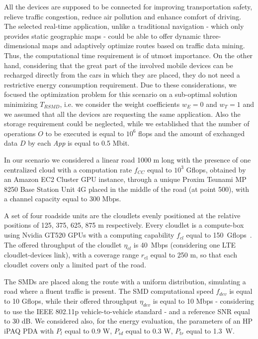 \documentclass[twoside,openright]{report}
\begin{document}
All the devices are supposed to be connected for improving transportation safety, relieve traffic congestion, reduce air pollution and enhance comfort  of driving.
The selected real-time application, unlike a traditional navigation - which only provides static geographic maps - could be able to offer dynamic three-dimensional maps and adaptively optimize routes based on traffic data mining. 
Thus, the computational time requirement is of utmost importance. 
On the other hand, considering that the great part of the involved mobile devices can be recharged directly from the cars in which they are placed, they do not need a restrictive energy consumption requirement.  
Due to these considerations, we focused the optimization problem for this scenario on a sub-optimal solution minimizing $T_\textit{RSMD}$, i.e. we consider the weight coefficients $w_E = 0$ and $w_T = 1$ and we assumed that all the devices are requesting the same application. Also the storage requirement could be neglected, while we established that the number of operations $O$ to be executed is equal to $10^6$ flops and the amount of exchanged data $D$ by each \emph{App} is equal to 0.5 Mbit.  

In our scenario we considered a linear road 1000 m long with the presence of one centralized cloud with a computation rate $f_\textit{CC}$ equal to $10^3$ Gflops, obtained by an Amazon EC2 Cluster GPU instance, through a unique Proxim Tsunami MP 8250 Base Station Unit 4G placed in the middle of the road (at point 500), with a channel capacity equal to 300 Mbps. 

A set of four roadside units are the cloudlets evenly positioned at the relative positions of 125, 375, 625, 875 m respectively. Every cloudlet is a compute-box using Nvidia GT520 GPUs with  a computing capability $f_\textit{cl} $ equal to 150~Gflops~\cite{Soyata}. The offered throughput of the cloudlet $\eta_\textit{cl}$ is 40~Mbps (considering one LTE cloudlet-devices link), with a coverage range $r_{\text{cl}}$ equal to 250 m, so that each cloudlet covers only a limited part of the road. 


The \glspl{SMD} are placed along the route with a uniform distribution, simulating a road where a fluent traffic is present. The \gls{SMD} computational speed  $f_\textit{dev}$ is equal to 10 Gflops, while their offered throughput $\eta_{dev}$ is equal to 10 Mbps - considering to use the IEEE 802.11p vehicle-to-vehicle standard - and a reference \gls{SNR} equal to 30 dB. 
We considered also, for the energy evaluation, the parameters of an HP iPAQ PDA with $P_l$ equal to 0.9 W, $P_{\textit{id}}$ equal to 0.3 W, $P_{\textit{tr}}$ equal to 1.3~W.
\end{document}
